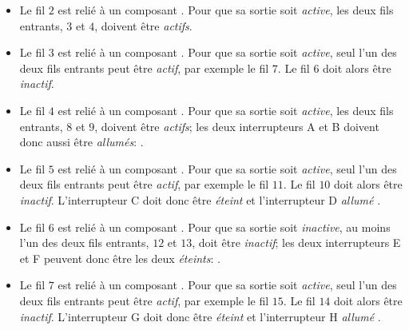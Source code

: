 {{\begin{itemize}
  \item Le fil $2$ est relié à un composant \raisebox{\dimexpr -0.5ex -0.6ex \relax}{}. Pour que sa sortie soit \emph{active}, les deux fils entrants, $3$ et $4$, doivent être \emph{actifs}.
  \item Le fil $3$ est relié à un composant \raisebox{\dimexpr -0.5ex -0.6ex \relax}{}. Pour que sa sortie soit \emph{active}, seul l’un des deux fils entrants peut être \emph{actif}, par exemple le fil $7$. Le fil $6$ doit alors être \emph{inactif}.
  \item Le fil $4$ est relié à un composant \raisebox{\dimexpr -0.5ex -0.6ex \relax}{}. Pour que sa sortie soit \emph{active}, les deux fils entrants, $8$ et $9$, doivent être \emph{actifs}; les deux interrupteurs A et B doivent donc aussi être \emph{allumés}: \raisebox{-0.5ex}{}.
  \item Le fil $5$ est relié à un composant \raisebox{\dimexpr -0.5ex -0.6ex \relax}{}. Pour que sa sortie soit \emph{active}, seul l’un des deux fils entrants peut être \emph{actif}, par exemple le fil $11$. Le fil $10$ doit alors être \emph{inactif}. L’interrupteur C doit donc être \emph{éteint} \raisebox{-0.5ex}{} et l’interrupteur D \emph{allumé} \raisebox{-0.5ex}{}.
  \item Le fil $6$ est relié à un composant \raisebox{\dimexpr -0.5ex -0.6ex \relax}{}. Pour que sa sortie soit \emph{inactive}, au moins l’un des deux fils entrants, $12$ et $13$, doit être \emph{inactif}; les deux interrupteurs E et F peuvent donc être les deux \emph{éteints}: \raisebox{-0.5ex}{}.
  \item Le fil $7$ est relié à un composant \raisebox{\dimexpr -0.5ex -0.6ex \relax}{}. Pour que sa sortie soit \emph{active}, seul l’un des deux fils entrants peut être \emph{actif}, par exemple le fil $15$. Le fil $14$ doit alors être \emph{inactif}. L’interrupteur G doit donc être \emph{éteint} \raisebox{-0.5ex}{} et l’interrupteur H \emph{allumé} \raisebox{-0.5ex}{}.
\end{itemize}

}}
